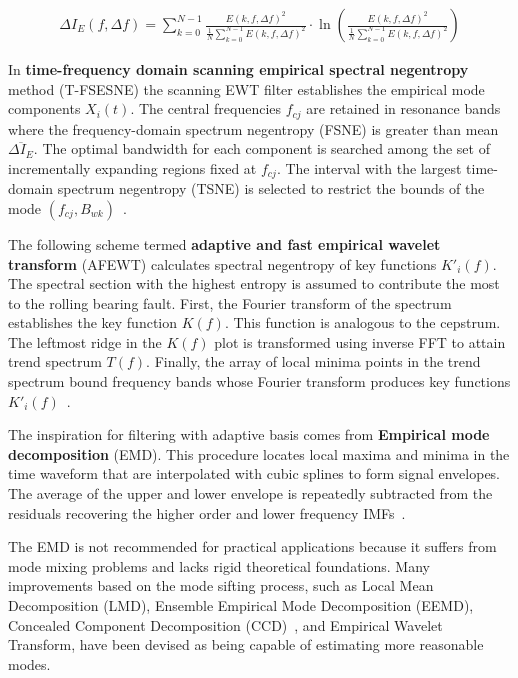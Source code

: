 \begin{ceqn}\begin{align}
\Delta I_E(f, \Delta f) = \sum_{k = 0}^{N - 1}{\frac{E(k, f, \Delta f)^2}{\frac{1}{N} \sum_{k=0}^{N-1} E(k, f, \Delta f)^2}} \cdot \ln\left(\frac{E(k, f, \Delta f)^2}{\frac{1}{N} \sum_{k=0}^{N-1} E(k, f, \Delta f)^2}\right)
\label{equ:spectral-negentropy}
\end{align}\end{ceqn}

In \textbf{time-frequency domain scanning empirical spectral negentropy} method (T-FSESNE) the scanning EWT filter establishes the empirical mode components $X_i(t)$. The central frequencies $f_{cj}$ are retained in resonance bands where the frequency-domain spectrum negentropy (FSNE) is greater than mean $\overline{\Delta I_E}$. The optimal bandwidth for each component is searched among the set of incrementally expanding regions fixed at $f_{cj}$. The interval with the largest time-domain spectrum negentropy (TSNE) is selected to restrict the bounds of the mode $(f_{cj}, B_{wk})$~\cite{yonggang_time_2020}.

The following scheme termed \textbf{adaptive and fast empirical wavelet transform} (AFEWT) calculates spectral negentropy of key functions $K'_i(f)$. The spectral section with the highest entropy is assumed to contribute the most to the rolling bearing fault. First, the Fourier transform of the spectrum establishes the key function $K(f)$. This function is analogous to the cepstrum. The leftmost ridge in the $K(f)$ plot is transformed using inverse FFT to attain trend spectrum $T(f)$. Finally, the array of local minima points in the trend spectrum bound frequency bands whose Fourier transform produces key functions $K'_i(f)$~\cite{xu_adaptive_2019}. 

The inspiration for filtering with adaptive basis comes from \textbf{Empirical mode decomposition} (EMD). This procedure locates local maxima and minima in the time waveform that are interpolated with cubic splines to form signal envelopes. The average of the upper and lower envelope is repeatedly subtracted from the residuals recovering the higher order and lower frequency IMFs~\cite{wang_computational_2014}. 

The EMD is not recommended for practical applications because it suffers from mode mixing problems and lacks rigid theoretical foundations. Many improvements based on the mode sifting process, such as Local Mean Decomposition (LMD), Ensemble Empirical Mode Decomposition (EEMD), Concealed Component Decomposition (CCD)~\cite{tiwari_novel_2021}, and Empirical Wavelet Transform, have been devised as being capable of estimating more reasonable modes.


